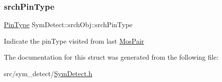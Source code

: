 \subsubsection{\texorpdfstring{srch\+Pin\+Type}{srchPinType}}
{\footnotesize\ttfamily \hyperlink{type_8h_afaab50027002ecbb6c8ac27e727d1bb4}{Pin\+Type} Sym\+Detect\+::srch\+Obj\+::srch\+Pin\+Type}

Indicate the pin\+Type visited from last \hyperlink{structMosPair}{Mos\+Pair} 

The documentation for this struct was generated from the following file\+:\begin{DoxyCompactItemize}
\item 
src/sym\+\_\+detect/\hyperlink{SymDetect_8h}{Sym\+Detect.\+h}\end{DoxyCompactItemize}
